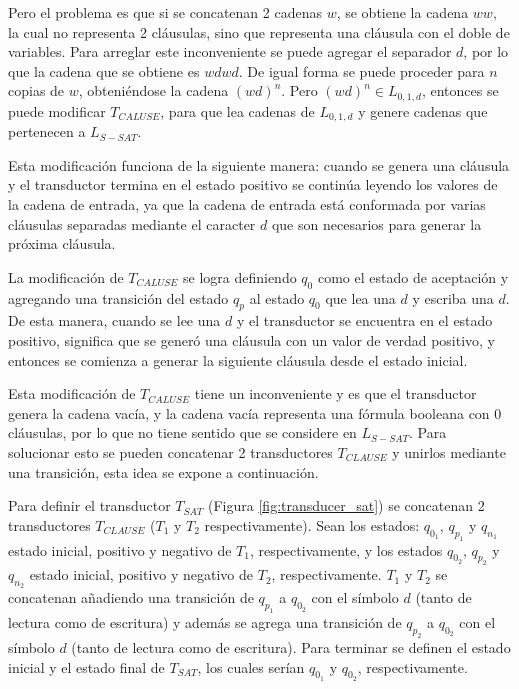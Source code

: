 Pero el problema es que si se concatenan 2 cadenas $w$, se obtiene la cadena $ww$, la cual no representa 2 cláusulas,
sino que representa una cláusula con el doble de variables. Para arreglar este inconveniente se puede agregar el separador
$d$, por lo que la cadena que se obtiene es $wdwd$. De igual forma se puede proceder para $n$ copias de $w$, obteniéndose
la cadena $(wd)^n$. Pero $(wd)^n\in L_{0,1,d}$, entonces se puede modificar $T_{CALUSE}$, para que lea cadenas de $L_{0,1,d}$ y genere cadenas que pertenecen a $L_{S-SAT}$.

Esta modificación funciona de la siguiente manera: 
cuando se genera una cláusula y el transductor termina en el estado positivo se continúa leyendo los valores de la cadena de entrada, ya que la cadena de entrada está conformada por varias cláusulas separadas mediante el caracter $d$ que son necesarios para generar la próxima cláusula.

La modificación de $T_{CALUSE}$ se logra definiendo $q_0$ como el estado de aceptación y agregando una 
transición del estado $q_p$ al estado $q_0$ que lea una $d$ y escriba una $d$. De esta manera, cuando se lee una $d$ y el transductor se encuentra en el estado positivo, significa
que se generó una cláusula con un valor de verdad positivo, y entonces se comienza a generar la siguiente cláusula desde el estado inicial. 

Esta modificación de $T_{CALUSE}$ tiene un inconveniente y es que el transductor genera la cadena vacía, y la cadena vacía representa una fórmula booleana con 0 cláusulas, por lo que no tiene sentido que se considere en $L_{S-SAT}$. Para solucionar esto se pueden concatenar 2 transductores $T_{CLAUSE}$ y unirlos mediante una transición, esta idea se expone a continuación.

Para definir el transductor $T_{SAT}$ (Figura \ref{fig:transducer_sat}) se concatenan 2 transductores $T_{CLAUSE}$ ($T_1$ y $T_2$ respectivamente). Sean los estados: $q_{0_1}$, $q_{p_1}$ y $q_{n_1}$ estado inicial, positivo y negativo de $T_1$, respectivamente, y los estados $q_{0_2}$, $q_{p_2}$ y $q_{n_2}$ estado inicial, positivo y negativo de $T_2$, respectivamente. $T_1$ y $T_2$ se concatenan añadiendo una transición de $q_{p_1}$ a $q_{0_2}$ con el símbolo $d$ (tanto de lectura como de escritura) y además se agrega una transición de $q_{p_2}$ a $q_{0_2}$ con el símbolo $d$ (tanto de lectura como de escritura).  Para terminar se definen el estado inicial y el estado final de $T_{SAT}$, los cuales serían $q_{0_1}$ y $q_{0_2}$, respectivamente.



